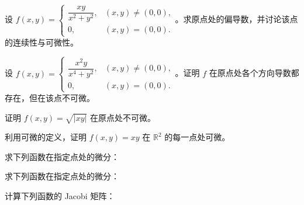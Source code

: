 \noindent\begin{minipage}{\textwidth}
设 $f(x,y)=\begin{cases}\dfrac{xy}{x^2+y^2},&(x,y)\ne(0,0),\\0,&(x,y)=(0,0).\end{cases}$。求原点处的偏导数，并讨论该点的连续性与可微性。
\end{minipage}\par\vfill
\newpage
\noindent\begin{minipage}{\textwidth}
设 $f(x,y)=\begin{cases}\dfrac{x^2y}{x^4+y^2},&(x,y)\ne(0,0),\\0,&(x,y)=(0,0).\end{cases}$。证明 $f$ 在原点处各个方向导数都存在，但在该点不可微。
\end{minipage}\par\vfill
\noindent\begin{minipage}{\textwidth}
证明 $f(x,y)=\sqrt{|xy|}$ 在原点处不可微。
\end{minipage}\par\vfill
\noindent\begin{minipage}{\textwidth}
利用可微的定义，证明 $f(x,y)=xy$ 在 $\mathbb R^2$ 的每一点处可微。
\end{minipage}\par\vfill
\newpage
\noindent\begin{minipage}{\textwidth}
求下列函数在指定点处的微分：
\end{minipage}\par\vfill
\noindent\begin{minipage}{\textwidth}
求下列函数在指定点处的微分：
\end{minipage}\par\vfill
\noindent\begin{minipage}{\textwidth}
计算下列函数的 Jacobi 矩阵：
\end{minipage}\par\vfill
